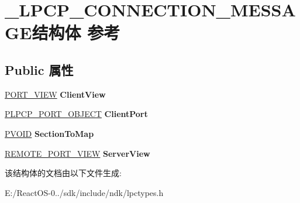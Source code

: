 \hypertarget{struct___l_p_c_p___c_o_n_n_e_c_t_i_o_n___m_e_s_s_a_g_e}{}\section{\+\_\+\+L\+P\+C\+P\+\_\+\+C\+O\+N\+N\+E\+C\+T\+I\+O\+N\+\_\+\+M\+E\+S\+S\+A\+G\+E结构体 参考}
\label{struct___l_p_c_p___c_o_n_n_e_c_t_i_o_n___m_e_s_s_a_g_e}
\subsection*{Public 属性}
\begin{DoxyCompactItemize}
\item 
\mbox{\label{struct___l_p_c_p___c_o_n_n_e_c_t_i_o_n___m_e_s_s_a_g_e_afb27ad95b717dffbdc0a3e90622e44ec}} 
\hyperlink{struct___p_o_r_t___v_i_e_w}{P\+O\+R\+T\+\_\+\+V\+I\+EW} {\bfseries Client\+View}
\item 
\mbox{\label{struct___l_p_c_p___c_o_n_n_e_c_t_i_o_n___m_e_s_s_a_g_e_a0ddebd469d25ca77a5d700fbce465df9}} 
\hyperlink{struct___l_p_c_p___p_o_r_t___o_b_j_e_c_t}{P\+L\+P\+C\+P\+\_\+\+P\+O\+R\+T\+\_\+\+O\+B\+J\+E\+CT} {\bfseries Client\+Port}
\item 
\mbox{\label{struct___l_p_c_p___c_o_n_n_e_c_t_i_o_n___m_e_s_s_a_g_e_a01266a32f024fa7732e293653964aec2}} 
\hyperlink{interfacevoid}{P\+V\+O\+ID} {\bfseries Section\+To\+Map}
\item 
\mbox{\label{struct___l_p_c_p___c_o_n_n_e_c_t_i_o_n___m_e_s_s_a_g_e_accb2b2c529abbe8c2b2a7917887a29d2}} 
\hyperlink{struct___r_e_m_o_t_e___p_o_r_t___v_i_e_w}{R\+E\+M\+O\+T\+E\+\_\+\+P\+O\+R\+T\+\_\+\+V\+I\+EW} {\bfseries Server\+View}
\end{DoxyCompactItemize}


该结构体的文档由以下文件生成\+:\begin{DoxyCompactItemize}
\item 
E\+:/\+React\+O\+S-\/0../sdk/include/ndk/lpctypes.\+h\end{DoxyCompactItemize}
